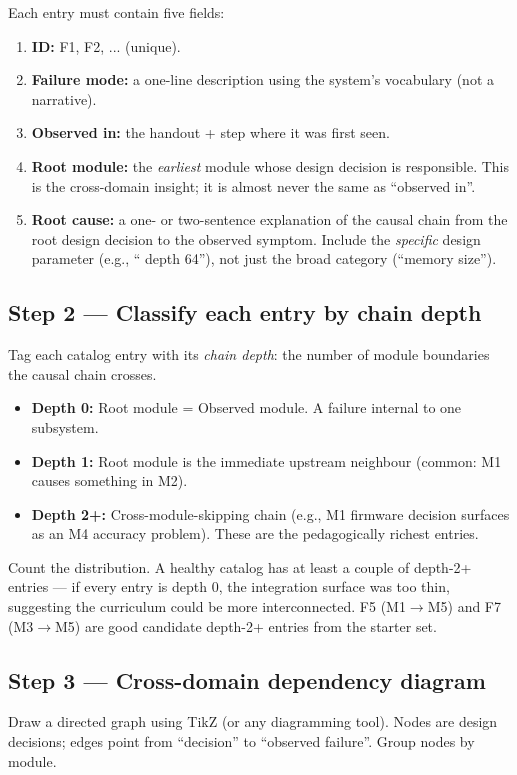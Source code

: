 \documentclass[11pt,letterpaper]{article}
\begin{document}
\begin{tcolorbox}[infobox={Catalog Entry Structure}]
	Each entry must contain five fields:
	\begin{enumerate}[leftmargin=1.2em]
		\item \textbf{ID:} F1, F2, ... (unique).
		\item \textbf{Failure mode:} a one-line description using the system's vocabulary (not a narrative).
		\item \textbf{Observed in:} the handout + step where it was first seen.
		\item \textbf{Root module:} the \emph{earliest} module whose design decision is responsible. This is the cross-domain insight; it is almost never the same as ``observed in''.
		\item \textbf{Root cause:} a one- or two-sentence explanation of the causal chain from the root design decision to the observed symptom. Include the \emph{specific} design parameter (e.g., ``\FIFO{} depth 64''), not just the broad category (``memory size'').
	\end{enumerate}
\end{tcolorbox}

\subsection{Step 2 --- Classify each entry by chain depth}
Tag each catalog entry with its \emph{chain depth}: the number of module boundaries the causal chain crosses.
\begin{itemize}[leftmargin=2em]
	\item \textbf{Depth 0:} Root module = Observed module. A failure internal to one subsystem.
	\item \textbf{Depth 1:} Root module is the immediate upstream neighbour (common: M1 causes something in M2).
	\item \textbf{Depth 2+:} Cross-module-skipping chain (e.g., M1 firmware decision surfaces as an M4 accuracy problem). These are the pedagogically richest entries.
\end{itemize}

Count the distribution. A healthy catalog has at least a couple of depth-2+ entries --- if every entry is depth 0, the integration surface was too thin, suggesting the curriculum could be more interconnected. F5 (M1$\to$M5) and F7 (M3$\to$M5) are good candidate depth-2+ entries from the starter set.

\subsection{Step 3 --- Cross-domain dependency diagram}
Draw a directed graph using TikZ (or any diagramming tool). Nodes are design decisions; edges point from ``decision'' to ``observed failure''. Group nodes by module.
\end{document}
